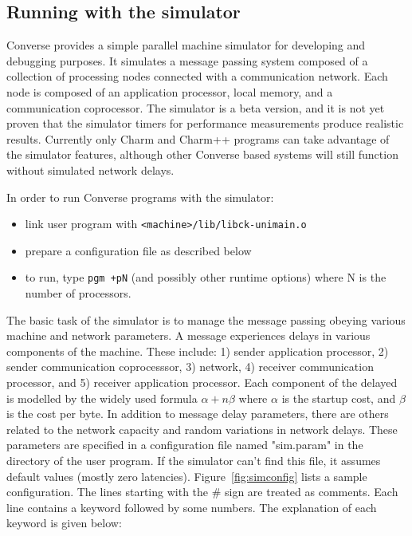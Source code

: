 \subsection[Running with the simulator]{Running with the simulator}

Converse provides a simple parallel machine simulator for developing
and debugging purposes.  It simulates a message passing system
composed of a collection of processing nodes connected with a
communication network. Each node is composed of an application
processor, local memory, and a communication coprocessor.  The
simulator is a beta version, and it is not yet proven that the
simulator timers for performance measurements produce realistic
results. Currently only Charm and Charm++ programs can take advantage
of the simulator features, although other Converse based systems will
still function without simulated network delays.


In order to run Converse programs with the simulator:
\begin{itemize}

\item link user program with \verb+<machine>/lib/libck-unimain.o+

\item prepare a configuration file as described below

\item to run, type \verb#pgm +pN# (and possibly other runtime options) where
   N is the number of processors.

\end{itemize}

The basic task of the simulator is to manage the message passing
obeying various machine and network parameters.  A message experiences
delays in various components of the machine. These include: 1) sender
application processor, 2) sender communication coprocesssor, 3)
network, 4) receiver communication processor, and 5) receiver
application processor.  Each component of the delayed is modelled by
the widely used formula $\alpha + n\beta$ where $\alpha$ is the
startup cost, and $\beta$ is the cost per byte.  In addition to
message delay parameters, there are others related to the network
capacity and random variations in network delays. These parameters are
specified in a configuration file named "sim.param" in the directory
of the user program. If the simulator can't find this file, it assumes
default values (mostly zero latencies).  Figure~\ref{fig:simconfig}
lists a sample configuration. The lines starting with the \# sign are
treated as comments. Each line contains a keyword followed by some
numbers. The explanation of each keyword is given below:

